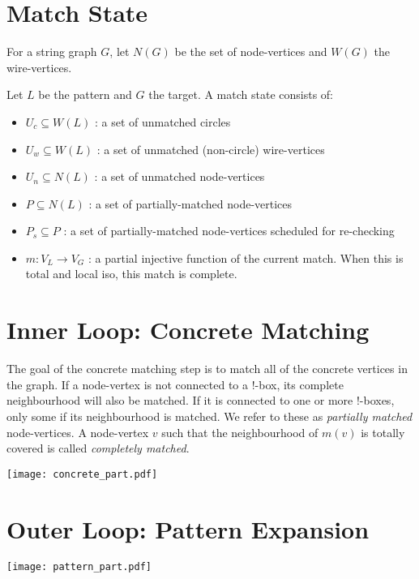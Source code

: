 \documentclass{article}
\begin{document}
\section{Match State}

For a string graph $G$, let $N(G)$ be the set of node-vertices and $W(G)$ the wire-vertices.

Let $L$ be the pattern and $G$ the target. A match state consists of:

\begin{itemize}
    \item $U_c \subseteq W(L)$ : a set of unmatched circles
    \item $U_w \subseteq W(L)$ : a set of unmatched (non-circle) wire-vertices
    \item $U_n \subseteq N(L)$ : a set of unmatched node-vertices
    \item $P \subseteq N(L)$ : a set of partially-matched node-vertices
    \item $P_s \subseteq P$ : a set of partially-matched node-vertices scheduled for re-checking
    \item $m : V_L \rightarrow V_G$ : a partial injective function of the current match. When this is total and local iso, this match is complete.
\end{itemize}

\section{Inner Loop: Concrete Matching}

The goal of the concrete matching step is to match all of the concrete vertices in the graph. If a node-vertex is not connected to a !-box, its complete neighbourhood will also be matched. If it is connected to one or more !-boxes, only some if its neighbourhood is matched. We refer to these as \textit{partially matched} node-vertices. A node-vertex $v$ such that the neighbourhood of $m(v)$ is totally covered is called \textit{completely matched}.

\begin{center}
    \texttt{[image: concrete\_part.pdf]}
\end{center}

\section{Outer Loop: Pattern Expansion}

\begin{center}
    \texttt{[image: pattern\_part.pdf]}
\end{center}
\end{document}
